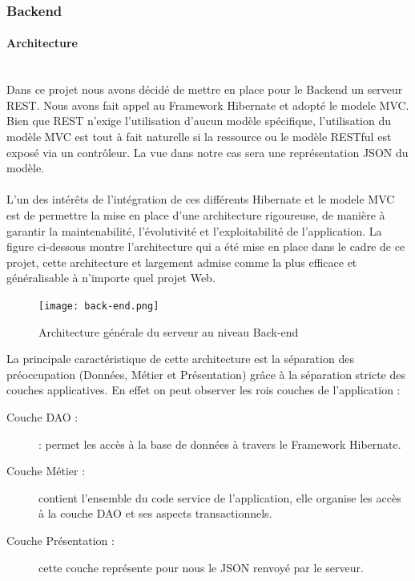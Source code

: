 \documentclass[12pt]{article}
\begin{document}
\subsubsection{Backend}

\paragraph{Architecture}\leavevmode \\
Dans ce projet nous avons décidé de mettre en place pour le Backend un serveur REST. Nous avons fait appel au Framework Hibernate et adopté le modele  MVC. Bien que REST n'exige l'utilisation d'aucun modèle spécifique, l'utilisation du modèle MVC est tout à fait naturelle si la ressource ou le modèle RESTful est exposé via un contrôleur. La vue dans notre cas sera une représentation JSON du modèle.
\paragraph{}
L'un des intérêts de l'intégration de ces différents Hibernate et le modele MVC  est de permettre la mise en place d'une architecture rigoureuse, de manière à garantir la maintenabilité, l'évolutivité et l'exploitabilité de l'application. La figure ci-dessous montre l'architecture qui a été mise en place dans le cadre de ce projet, cette architecture et largement admise comme la plus efficace et généralisable à n'importe quel projet Web.

\begin{figure}[H]
    \centering
    \texttt{[image: back-end.png]}
    \caption{Architecture générale du serveur au niveau Back-end}
    \label{fig:archiApplication}
\end{figure}


La principale caractéristique de cette architecture est la séparation des préoccupation  (Données, Métier et Présentation) grâce à la séparation stricte des couches applicatives. En effet on peut observer les  rois couches de l'application :
\begin{description}
    \item [Couche DAO :] : permet les accès à la base de données à travers le Framework Hibernate.
    \\
    \item [Couche Métier :] contient l'ensemble du code service de l'application, elle organise les accès à la couche DAO et ses aspects transactionnels.
    \\
    \item [Couche Présentation :] cette couche représente pour nous  le JSON renvoyé par le serveur.
\end{description}
\newpage
\end{document}
